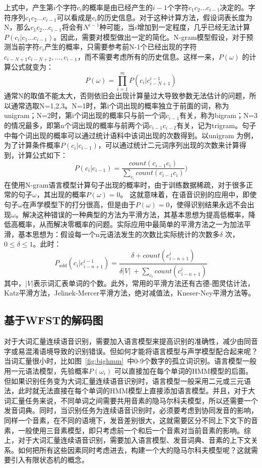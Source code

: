 上式中，产生第$i$个字符$c_i$的概率是由已经产生的$i-1$个字符$c_1 c_2...c_{i-1}$决定的。字符序列$c_1 c_2...c_{i-1}$可以看成是$c_i$的历史信息。对于这种计算方法，假设词表长度为N，那么$c_1 c_2...c_{i-1}$将会有$N^{i-1}$种可能，当$i$增加到一定程度，几乎已经无法计算$P(c_i|c_1...c_{i-1})$。因此，需要对模型做出一定的简化。N-gram模型假设，对于预测当前字符$c_i$产生的概率，只需要参考前N-1个已经出现的字符$c_{i-N+1} c_{i-N+2},...,c_{i-1}$，而不需要考虑所有的历史信息。这样一来，$P(\omega)$ 的计算公式就变为：
\begin{equation}P(\omega) = \prod\limits_{i=1}^m P(c_i|c_{i-N+1}^{i-1})\end{equation}
通常N的取值不能太大，否则依旧会出现计算量过大导致参数无法估计的问题，所以通常选取N=1,2,3。N=1时，第i个词出现的概率独立于前面的词，称为unigram；N=2时，第i个词出现的概率只与前一个词$c_{i-1}$有关，称为bigram；N=3的情况最多，即第n个词出现的概率与前两个词$c_{i-1}c_{i-2}$有关，记为trigram。句子中每个词出现的概率可以通过统计语料中该词出现的次数得到。以unigram 为例，为了计算条件概率$P(c_i|c_{i-1})$，可以通过统计二元词序列出现的次数来计算得到，计算公式如下：
\begin{equation}P(c_i|c_{i-1})=\frac{count(c_{i-1} c_i)}{\sum\limits_{c_i} count(c_{i-1} c_i)})\end{equation}
在使用N-gram语言模型计算句子出现的概率时，由于训练数据稀疏，对于很多正常的句子$\omega$，其出现的概率$P(\omega)=0$。 这就意味着，在语音识别的应用中，即使句子$\omega$在声学模型下的打分很高，但是由于$P(\omega)=0$，使得识别结果永远不会出现$\omega$。解决这种错误的一种典型的方法为平滑方法，其基本思想为提高低概率，降低高概率，从而解决零概率的问题。实际应用中最简单的平滑方法之一为加法平滑，基本思想为：假设每一个n元语法发生的次数比实际统计的次数多$\delta$ 次，$0\leqslant \delta \leqslant 1$。此时：
\begin{equation}P_{add}(c_i|c_{i-n+1}^{i-1})=\frac{\delta+count(c_{i-n+1}^{i})}{\delta \lvert V\rvert\ + \sum\limits_{c_i} count(c_{i-n+1}^i)}\end{equation}
其中，$\lvert V\rvert$表示词汇表单词的个数。此外，常用的平滑方法还有古德-图灵估计法，Katz平滑方法，Jelinek-Mercer平滑方法，绝对减值法，Kneser-Ney平滑方法等\cite{goodman2001bit}。

\subsection{基于WFST的解码图}
对于大词汇量连续语音识别，需要加入语言模型来提高识别的准确性，减少由同音字或易混淆语境导致的识别错误。但如何才能将语言模型与声学模型配合起来呢？当词汇量很小时，比如图~\ref{fig:bighmm}~中0-9个数字的孤立词识别。语言模型一般用一元语法模型，先验概率$P(\omega_i)$ 可以直接加在每个单词的HMM模型的后面。但如果识别任务变为大词汇量连续语音识别时，语言模型一般采用二元或三元语法，此时就无法直接在每个单词的HMM模型上直接添加语言模型。并且，对于大词汇量任务来说，不同单词之间需要共用音素的隐马尔科夫模型，所以还需要一个发音词典。同时，当识别任务为连续语音识别时，必须要考虑到协同发音的影响，同样一个音素，在不同的语境下，发音差别很大，这就需要区分不同上下文下的音素，一般使用三音素模型，即只考虑前一个和后一个音素对当前音素的影响。综上，对于大词汇量连续语音识别，需要加入语言模型、发音词典、音素的上下文关系。如何把所有这些因素同时考虑进去，构建一个大的隐马尔科夫模型呢？这就需要引入有限状态机的概念。

